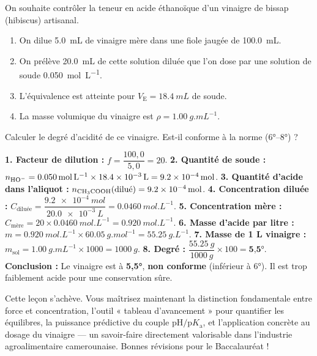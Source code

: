 \documentclass[11pt]{article}
\begin{document}
\begin{exercice}
On souhaite contrôler la teneur en acide éthanoïque d'un vinaigre de bissap (hibiscus) artisanal.
\begin{enumerate}
\item On dilue \SI{5,0}{mL} de vinaigre mère dans une fiole jaugée de \SI{100,0}{mL}.
\item On prélève \SI{20,0}{mL} de cette solution diluée que l'on dose par une solution de soude \SI{0,050}{mol.L^{-1}}.
\item L'équivalence est atteinte pour $V_\text{E} = \SI{18,4}{mL}$ de soude.
\item La masse volumique du vinaigre est $\rho = \SI{1,00}{g.mL^{-1}}$.
\end{enumerate}
Calculer le degré d'acidité de ce vinaigre. Est-il conforme à la norme (6°–8°) ?
\begin{corrige}
\textbf{1. Facteur de dilution :} $f = \dfrac{100,0}{5,0} = 20$.
\textbf{2. Quantité de soude :} $n_{\ce{HO-}} = \SI{0,050}{mol.L^{-1}} \times \SI{18,4e-3}{L} = \SI{9,2e-4}{mol}$.
\textbf{3. Quantité d'acide dans l'aliquot :} $n_{\ce{CH3COOH}}(\text{dilué}) = \SI{9,2e-4}{mol}$.
\textbf{4. Concentration diluée :} $C_\text{diluée} = \dfrac{\SI{9,2e-4}{mol}}{\SI{20,0e-3}{L}} = \SI{0,0460}{mol.L^{-1}}$.
\textbf{5. Concentration mère :} $C_\text{mère} = 20 \times \SI{0,0460}{mol.L^{-1}} = \SI{0,920}{mol.L^{-1}}$.
\textbf{6. Masse d'acide par litre :} $m = \SI{0,920}{mol.L^{-1}} \times \SI{60,05}{g.mol^{-1}} = \SI{55,25}{g.L^{-1}}$.
\textbf{7. Masse de 1 L vinaigre :} $m_\text{sol} = \SI{1,00}{g.mL^{-1}} \times 1000 = \SI{1000}{g}$.
\textbf{8. Degré :} $\dfrac{\SI{55,25}{g}}{\SI{1000}{g}} \times 100 = \textbf{5,5°}$.
\textbf{Conclusion :} Le vinaigre est à \textbf{5,5°}, \textbf{non conforme} (inférieur à 6°). Il est trop faiblement acide pour une conservation sûre.
\end{corrige}
\end{exercice}

Cette leçon s'achève. Vous maîtrisez maintenant la distinction fondamentale entre force et concentration, l'outil « tableau d'avancement » pour quantifier les équilibres, la puissance prédictive du couple $\mathrm{pH}/\mathrm{p}K_\mathrm{a}$, et l'application concrète au dosage du vinaigre — un savoir-faire directement valorisable dans l'industrie agroalimentaire camerounaise. Bonnes révisions pour le Baccalauréat !

\newpage
\end{document}
